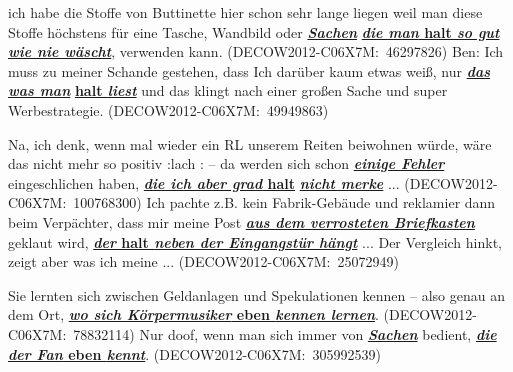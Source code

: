 \begin{exe}
	\ex\label{744} 
		\begin{xlist}
		\ex\label{744a} 
		\scriptsize
		ich habe die Stoffe von Buttinette hier schon sehr lange liegen weil man diese Stoffe 											höchstens für eine Tasche, Wandbild oder \underline{\textbf{\textit{Sachen}}} \underline{\textbf{\textit{die man} halt 			\textit{so gut wie nie wäscht}}}, verwenden kann. 
		\newline	
	 	\hbox{}\hfill\hbox{(DECOW2012-C06X7M: 46297826)}
	 	\newline
	 	\hbox{}\hfill\hbox{\citet[168]{Mueller2016a}}
	 	\ex\label{744b} 
	 	\scriptsize
	 	Ben: Ich muss zu meiner Schande gestehen, dass Ich darüber kaum etwas weiß, nur 												\underline{\textbf{\textit{das}}} \underline{\textbf{\textit{was man}}} \underline{\textbf{halt \textit{liest}}} und 			das klingt nach einer großen Sache und super Werbestrategie.
	 	\newline
	 	\hbox{}\hfill\hbox{(DECOW2012-C06X7M: 49949863)}
		\end{xlist}
\end{exe}

\begin{exe}
	\ex\label{745} 
		\begin{xlist}	
		\ex\label{745a} 
		\scriptsize
		Na, ich denk, wenn mal wieder ein RL unserem Reiten beiwohnen würde, wäre das nicht mehr
	 	so positiv :lach : – da werden sich schon \underline{\textbf{\textit{einige Fehler}}} eingeschlichen haben, 					\underline{\textbf{\textit{die ich aber grad} halt}} \underline{\textit{\textbf{nicht merke}}} ...
	 	\hfill\hbox{(DECOW2012-C06X7M: 100768300)}
	 	\newline
	 	\hbox{}\hfill\hbox{\citet[168]{Mueller2016a}}
	 	\ex\label{745b} 
	 	\scriptsize
	 	Ich pachte z.B. kein Fabrik-Gebäude und reklamier dann beim Verpächter, dass mir meine Post 									\underline{\textbf{\textit{aus dem verrosteten Briefkasten}}} geklaut wird, \underline{\textbf{\textit{der} halt 				\textit{neben der Eingangstür hängt}}} ... Der Vergleich hinkt, zeigt aber was ich meine ...                  
		\hfill\hbox{(DECOW2012-C06X7M: 25072949)}
		\end{xlist}
\end{exe}			
	
\begin{exe}
	\ex\label{746} 
		\begin{xlist}	
		\ex\label{746a} 
		\scriptsize
		Sie lernten sich zwischen Geldanlagen und Spekulationen kennen – also genau
	 	an dem Ort, \underline{\textbf{\textit{wo sich Körpermusiker} eben \textit{kennen lernen}}}. 
	 	\hfill\hbox{(DECOW2012-C06X7M: 78832114)}
	 	\newline
	 	\hbox{}\hfill\hbox{\citet[168]{Mueller2016a}}
	 	\ex\label{746b} 
	 	\scriptsize
	 	Nur doof, wenn man sich immer von \underline{\textit{\textbf{Sachen}}} bedient, \underline{\textbf{\textit{die der Fan} 		eben \textit{kennt}}}.     
	 	\newline
	 	\hbox{}\hfill\hbox{(DECOW2012-C06X7M: 305992539)}
		\end{xlist}
\end{exe}
 					                     
